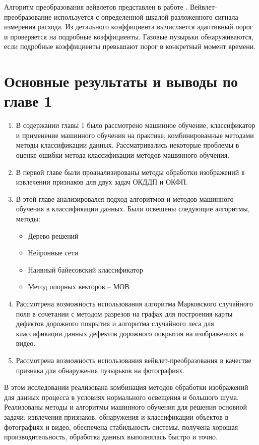 \documentclass[a4paper,14pt]{extreport}
\begin{document}
Алгоритм преобразования вейвлетов представлен в работе \cite{14wl}. Вейвлет-преобразование используется с определенной шкалой разложенного сигнала измерения расхода. Из детального коэффициента вычисляется адаптивный порог и проверяется на подробные коэффициенты. Газовые пузырьки обнаруживаются, если подробные коэффициенты превышают порог в конкретный момент времени.

\section{Основные результаты и выводы по главе 1}

\begin{enumerate}
	\item В содержании главы 1 было рассмотрено машинное обучение, классификатор и применение машинного обучения на практике, комбинированные методами методы классификации данных. Рассматривались некоторые проблемы в оценке ошибки метода классификации методов машинного обучения.
	\item В первой главе были проанализированы методы обработки изображений в извлечении признаков для двух задач ОКДДП и ОКФП.
\item  В этой главе анализировался подход алгоритмов и методов машинного обучения в классификации данных. Были освещены следующие алгоритмы, методы:

\begin{itemize}
	 \item Дерево решений
   \item Нейронные сети 
   \item Наивный байесовский классификатор
   \item Метод опорных векторов – МОВ
\end{itemize}

\item Рассмотрена возможность использования алгоритма Марковского случайного поля в сочетании с методом разрезов на графах для построения карты дефектов дорожного покрытия и алгоритма случайного леса для классификации данных дефектов дорожного покрытия на изображениях и видео.
\item Рассмотрена возможность использования вейвлет-преобразования в качестве признака для обнаружения пузырьков на фотографиях.
\end{enumerate}
В этом исследовании реализована комбинация методов обработки изображений для данных процесса в условиях нормального освещения и большого шума. Реализованы методы и алгоритмы машинного обучения для решения основной задачи: извлечения признаков, обнаружения и классификации объектов в фотографиях и видео, обеспечена стабильность системы, получена хорошая производительность, обработка данных выполнялась быстро и точно.
\end{document}
